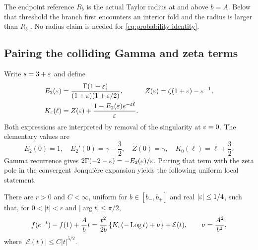 The endpoint reference $R_b$ is the actual Taylor radius at and above
$b=A$. Below that threshold the branch first encounters an interior
fold and the radius is larger than $R_b$ \cite{repo-boundary}.
No radius claim is needed for \eqref{eq:probability-identity}.

\subsection{Pairing the colliding Gamma and zeta terms}

Write $s=3+\varepsilon$ and define
\begin{align}
 E_2(\varepsilon)&=\frac{\Gamma(1-\varepsilon)}{(1+\varepsilon)(1+\varepsilon/2)},
 & Z(\varepsilon)&=\zeta(1+\varepsilon)-\varepsilon^{-1},\label{eq:E-Z}\\
 K_\varepsilon(\ell)&=Z(\varepsilon)+
      \frac{1-E_2(\varepsilon)e^{-\varepsilon\ell}}{\varepsilon}.
      \label{eq:K}
\end{align}
Both expressions are interpreted by removal of the singularity at
$\varepsilon=0$. The elementary values are
\begin{equation}\label{eq:resonant-values}
 E_2(0)=1,\quad E_2'(0)=\gamma-\frac32,\quad
 Z(0)=\gamma,\quad K_0(\ell)=\ell+\frac32.
\end{equation}
Gamma recurrence gives
$2\Gamma(-2-\varepsilon)=-E_2(\varepsilon)/\varepsilon$. Pairing that term with the
zeta pole in the convergent Jonqui\`ere expansion yields the following
uniform local statement.

\begin{lemma}
\label{lem:local}
There are $r>0$ and $C<\infty$, uniform for $b\in[b_-,b_+]$ and
real $|\varepsilon|\le1/4$, such that, for
$0<|t|<r$ and $|\arg t|\le\pi/2$,
\begin{equation}\label{eq:local-exponent}
 f(e^{-t})-f(1)+\frac Ab t
 =\frac{t^2}{2b}\left\{K_\varepsilon(-\operatorname{Log} t)+\nu\right\}
   +\mathcal E(t),\qquad \nu=\frac{A^2}{b^2},
\end{equation}
where $|\mathcal E(t)|\le C|t|^{5/2}$.
\end{lemma}

